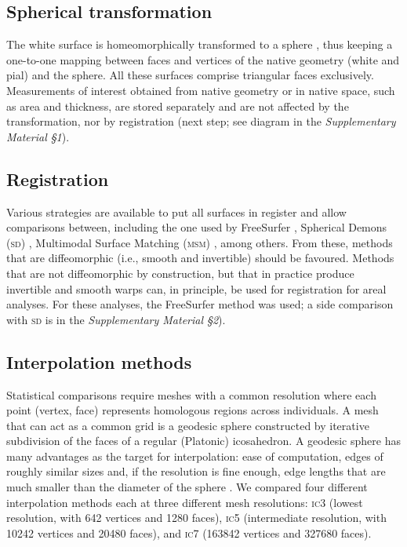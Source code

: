 \subsection{Spherical transformation}

The white surface is homeomorphically transformed to a sphere \citep{Fischl1999_intersubject}, thus keeping a one-to-one mapping between faces and vertices of the native geometry (white and pial) and the sphere. All these surfaces comprise triangular faces exclusively. Measurements of interest obtained from native geometry or in native space, such as area and thickness, are stored separately and are not affected by the transformation, nor by registration (next step; see diagram in the \emph{Supplementary Material §1}).

\subsection{Registration}

Various strategies are available to put all surfaces in register and allow comparisons between, including the one used by FreeSurfer \citep{Fischl1999_intersubject}, Spherical Demons (\textsc{sd}) \citep{Yeo2010}, Multimodal Surface Matching (\textsc{msm}) \citep{Robinson2014}, among others. From these, methods that are diffeomorphic (i.e., smooth and invertible) should be favoured. Methods that are not diffeomorphic by construction, but that in practice produce invertible and smooth warps can, in principle, be used for registration for areal analyses. For these analyses, the FreeSurfer method was used; a side comparison with \textsc{sd} is in the \emph{Supplementary Material §2}).

\subsection{Interpolation methods}

Statistical comparisons require meshes with a common resolution where each point (vertex, face) represents homologous regions across individuals. A mesh that can act as a common grid is a geodesic sphere constructed by iterative subdivision of the faces of a regular (Platonic) icosahedron. A geodesic sphere has many advantages as the target for interpolation: ease of computation, edges of roughly similar sizes and, if the resolution is fine enough, edge lengths that are much smaller than the diameter of the sphere \citep{Kenner1976}. We compared four different interpolation methods each at three different mesh resolutions: \textsc{ic}3 (lowest resolution, with 642 vertices and 1280 faces), \textsc{ic}5 (intermediate resolution, with 10242 vertices and 20480 faces),  and \textsc{ic}7 (163842 vertices and 327680 faces).

